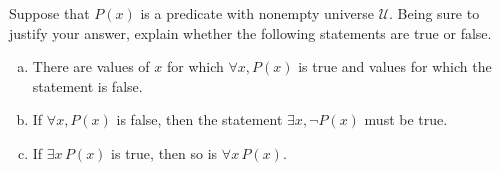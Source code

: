 \documentclass[11pt,letterpaper]{article}
\begin{document}

 Suppose that $P(x)$ is a predicate with nonempty universe $\mathcal{U}$. Being sure to justify your answer, explain whether the following statements are true or false.
	\begin{enumerate}[(a)]
	\item There are values of $x$ for which $\forall x, P(x)$ is true and values for which the statement is false. 
	\item If $\forall x, P(x)$ is false, then the statement $\exists x, \neg P(x)$ must be true. 
	\item If $\exists x\, P(x)$ is true, then so is $\forall x\, P(x)$.
	\end{enumerate} \pspace
\end{document}
